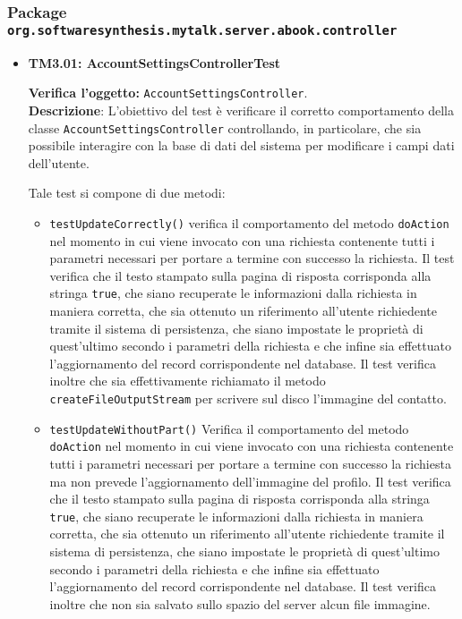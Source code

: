 \subsubsection{Package \texttt{org.softwaresynthesis.mytalk.server.abook.controller}}
\begin{itemize}

\item[\passed] \textbf{TM3.01: AccountSettingsControllerTest}

\textbf{Verifica l'oggetto:} \texttt{AccountSettingsController}.\\
\textbf{Descrizione}: L'obiettivo del test è verificare il corretto comportamento della classe \texttt{AccountSettingsController} controllando, in particolare, che sia possibile interagire con la base di dati del sistema per modificare i campi dati dell'utente.

Tale test si compone di due metodi:
\begin{itemize}
\item \texttt{testUpdateCorrectly()} verifica il comportamento del metodo \texttt{doAction} nel momento in cui viene invocato con una richiesta contenente tutti i parametri necessari per portare a termine con successo la richiesta. Il test verifica che il testo stampato sulla pagina di risposta corrisponda alla stringa \texttt{true}, che siano recuperate le informazioni dalla richiesta in maniera corretta, che sia ottenuto un riferimento all'utente richiedente tramite il sistema di persistenza, che siano impostate le proprietà di quest'ultimo secondo i parametri della richiesta e che infine sia effettuato l'aggiornamento del record corrispondente nel database. Il test verifica inoltre che sia effettivamente richiamato il metodo \texttt{createFileOutputStream} per scrivere sul disco l'immagine del contatto.

\item \texttt{testUpdateWithoutPart()} Verifica il comportamento del metodo \texttt{doAction} nel momento in cui viene invocato con una richiesta contenente tutti i parametri necessari per portare a termine con successo la richiesta ma non prevede l'aggiornamento dell'immagine del profilo. Il test verifica che il testo stampato sulla pagina di risposta corrisponda alla stringa \texttt{true}, che siano recuperate le informazioni dalla richiesta in maniera corretta, che sia ottenuto un riferimento all'utente richiedente tramite il sistema di persistenza, che siano impostate le proprietà di quest'ultimo secondo i parametri della richiesta e che infine sia effettuato l'aggiornamento del record corrispondente nel database. Il test verifica inoltre che non sia salvato sullo spazio del server alcun file immagine.


\end{itemize}
\end{itemize}
